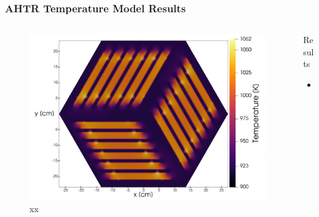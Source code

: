 \begin{frame}
    \frametitle{AHTR Temperature Model Results}
    \begin{columns}
        \begin{column}{0.5\textwidth}
            \begin{figure}[]
                \centering
                \includegraphics[width=0.85\linewidth]{../docs/figures/benchmark-temperature-model.png} 
                \caption{xx}
            \end{figure}
        \end{column}
        \begin{column}{0.5\textwidth} 
            \begin{block}{Results}
                \begin{itemize}
                    \item hi
                \end{itemize}
            \end{block}
        \end{column}
        \end{columns}

\end{frame}